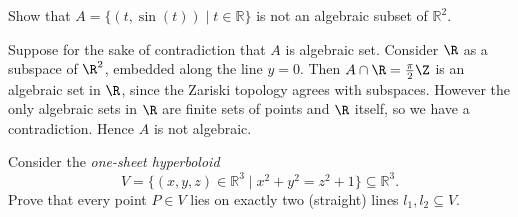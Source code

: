\documentclass[11pt,letterpaper]{article}
\begin{document}
\begin{problem}
  Show that $A=\{(t,\sin(t)) \mid t\in \mathbb R\}$ is not an algebraic subset of $\mathbb R^2$.
\end{problem}

\begin{changemargin}{1em}{1em}
  Suppose for the sake of contradiction that $A$ is algebraic set. Consider $\R$ as a subspace of $\R^2$, embedded along the line $y=0$. Then $A\cap \R=\frac{\pi}{2}\Z$ is an algebraic set in $\R$, since the Zariski topology agrees with subspaces. However the only algebraic sets in $\R$ are finite sets of points and $\R$ itself, so we have a contradiction. Hence $A$ is not algebraic.         
\end{changemargin}

\begin{problem}
  Consider the \emph{one-sheet hyperboloid}
  \[
    V = \{(x,y,z)\in\mathbb R^3 \mid x^2 + y^2 = z^2 + 1\} \subseteq \mathbb R^3.
  \]
  Prove that every point $P\in V$ lies on exactly two (straight) lines $l_1,l_2\subseteq V$.
\end{problem}
\end{document}
